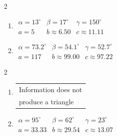 \documentclass{ximera}
\begin{document}
	\author{Stitz-Zeager}


\begin{multicols}{2}

\begin{enumerate}

\item $\begin{array}{lll}
\alpha = 13^{\circ} & \beta = 17^{\circ} & \gamma = 150^{\circ} \\
a = 5 & b \approx 6.50 & c \approx 11.11 \end{array}$

\item $\begin{array}{lll}
\alpha = 73.2^{\circ} & \beta = 54.1^{\circ} & \gamma = 52.7^{\circ} \\
a = 117 & b \approx 99.00 & c \approx 97.22 \end{array}$

\setcounter{HW}{\value{enumi}}

\end{enumerate}

\end{multicols}

\begin{multicols}{2} 

\begin{enumerate}

\setcounter{enumi}{\value{HW}}

\item \begin{tabular}{l}
Information does not \\
produce a triangle \end{tabular}

\item $\begin{array}{lll}
\alpha = 95^{\circ} & \beta = 62^{\circ} & \gamma = 23^{\circ} \\
a = 33.33 & b \approx 29.54 & c \approx 13.07 \end{array}$

\setcounter{HW}{\value{enumi}}

\end{enumerate}

\end{multicols}
\end{document}
